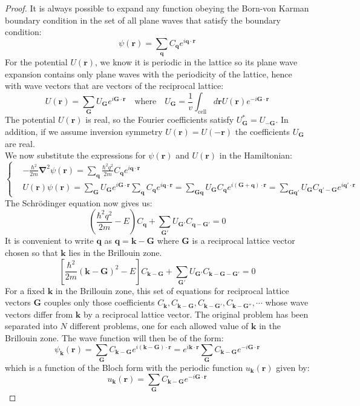 \documentclass[10.75pt,a4paper,openright,bottom=2cm]{article}
\renewcommand{\Vec}[1]{\boldsymbol{#1}}
\begin{document}
\begin{proof}
It is always possible to expand any function obeying the Born-von Karman boundary condition in the set of all plane waves that satisfy the boundary condition:
\[
\psi(\Vec{r})=\sum_{\Vec{q}}C_{\Vec{q}}e^{i\Vec{q}\cdot\Vec{r}}
\]
For the potential $U(\Vec{r})$, we know it is periodic in the lattice so its plane wave expansion contains only plane waves with the periodicity of the lattice, hence with wave vectors that are vectors of the reciprocal lattice:
\[
U(\Vec{r})=\sum_{\Vec{G}}U_{\Vec{G}}e^{i\Vec{G}\cdot\Vec{r}} \quad \text{where} \quad U_{\Vec{G}}=\frac{1}{v}\int_{\text{cell}}d\Vec{r}U(\Vec{r})e^{-i\Vec{G}\cdot\Vec{r}}
\]
The potential $U(\Vec{r})$ is real, so the Fourier coefficients satisfy $U_{\Vec{G}}^*=U_{-\Vec{G}}$. In addition, if we assume inversion symmetry $U(\Vec{r})=U(-\Vec{r})$ the coefficients $U_{\Vec{G}}$ are real.\\
We now substitute the expressions for $\psi(\Vec{r})$ and $U(\Vec{r})$ in the Hamiltonian:
\[
\left\{
\begin{aligned}
&-\frac{\hbar^2}{2m}\Vec{\nabla}^2\psi(\Vec{r})=\sum_{\Vec{q}}\frac{\hbar^2q^2}{2m}C_{\Vec{q}}e^{i\Vec{q}\cdot\Vec{r}}\\
&U(\Vec{r})\psi(\Vec{r})=\sum_{\Vec{G}}U_{\Vec{G}}e^{i\Vec{G}\cdot\Vec{r}}\sum_{\Vec{q}}C_{\Vec{q}}e^{i\Vec{q}\cdot\Vec{r}}=\sum_{\Vec{G}\Vec{q}}U_{\Vec{G}}C_{\Vec{q}}e^{i(\Vec{G}+\Vec{q})\cdot\Vec{r}}=\sum_{\Vec{G}\Vec{q'}}U_{\Vec{G}}C_{\Vec{q'}-\Vec{G}}e^{i\Vec{q'}\cdot\Vec{r}}
\end{aligned}
\right.
\]
The Schr\"odinger equation now gives us:
\[
\left(\frac{\hbar^2q^2}{2m}-E\right)C_{\Vec{q}}+\sum_{\Vec{G'}}U_{\Vec{G'}}C_{\Vec{q}-\Vec{G'}}=0
\]
It is convenient to write $\Vec{q}$ as $\Vec{q}=\Vec{k}-\Vec{G}$ where $\Vec{G}$ is a reciprocal lattice vector chosen so that $\Vec{k}$ lies in the  Brillouin zone.
\begin{equation}
\label{central}
\left[\frac{\hbar^2}{2m}(\Vec{k}-\Vec{G})^2-E\right]C_{\Vec{k}-\Vec{G}}+\sum_{\Vec{G'}}U_{\Vec{G'}}C_{\Vec{k}-\Vec{G}-\Vec{G'}}=0
\end{equation}
For a fixed $\Vec{k}$ in the  Brillouin zone, this set of equations for reciprocal lattice vectors $\Vec{G}$ couples only those coefficients $C_{\Vec{k}},C_{\Vec{k}-\Vec{G}},C_{\Vec{k}-\Vec{G'}}, C_{\Vec{k}-\Vec{G''}},\cdots$ whose wave vectors differ from $\Vec{k}$ by a reciprocal lattice vector. The original problem has been separated into $N$ different problems, one for each allowed value of $\Vec{k}$ in the  Brillouin zone. The wave function will then be of the form:
\[
\psi_{\Vec{k}}(\Vec{r})=\sum_{\Vec{G}}C_{\Vec{k}-\Vec{G}}e^{i(\Vec{k}-\Vec{G})\cdot\Vec{r}}=e^{i\Vec{k}\cdot\Vec{r}}\sum_{\Vec{G}}C_{\Vec{k}-\Vec{G}}e^{-i\Vec{G}\cdot\Vec{r}}
\]
which is a function of the Bloch form with the periodic function $u_{\Vec{k}}(\Vec{r})$ given by:
\[
u_{\Vec{k}}(\Vec{r})=\sum_{\Vec{G}}C_{\Vec{k}-\Vec{G}}e^{-i\Vec{G}\cdot\Vec{r}}
\]
\end{proof}
\end{document}
